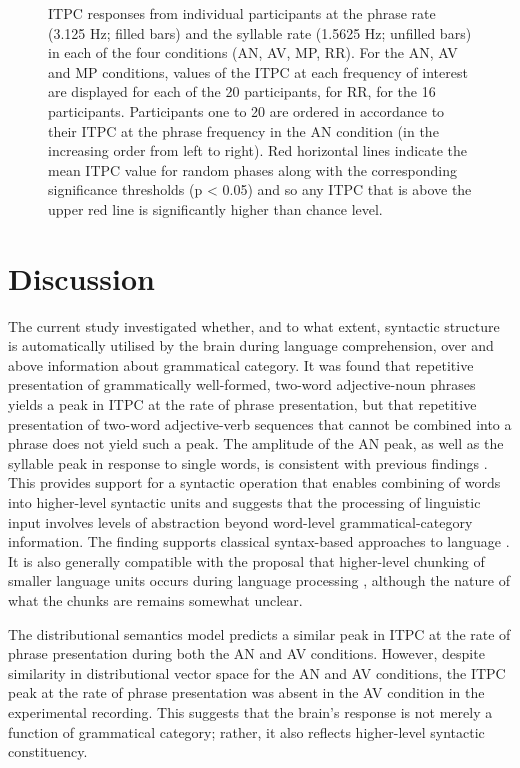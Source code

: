 \documentclass[10pt,letterpaper]{article}
\newcommand{\citet}[1]{\cite{#1}}
\begin{document}
\begin{figure}[tbhp]

\caption{ITPC responses from individual participants at the phrase
  rate (3.125 Hz; filled bars) and the syllable rate (1.5625 Hz;
  unfilled bars) in each of the four conditions (AN, AV, MP, RR). For
  the AN, AV and MP conditions, values of the ITPC at each frequency
  of interest are displayed for each of the 20 participants, for RR,
  for the 16 participants. Participants one to 20 are ordered in
  accordance to their ITPC at the phrase frequency in the AN condition
  (in the increasing order from left to right). Red horizontal lines
  indicate the mean ITPC value for random phases along with the
  corresponding significance thresholds (p < 0.05) and so any ITPC
  that is above the upper red line is significantly higher than chance
  level.}
\label{fig:Fig3}
\end{figure}


\section*{Discussion}


The current study investigated whether, and to what extent, syntactic
structure is automatically utilised by the brain during language
comprehension, over and above information about grammatical
category. It was found that repetitive presentation of grammatically
well-formed, two-word adjective-noun phrases yields a peak in ITPC at
the rate of phrase presentation, but that repetitive presentation of
two-word adjective-verb sequences that cannot be combined into a
phrase does not yield such a peak. The amplitude of the AN peak, as well
as the syllable peak in response to single words, is consistent with
previous findings \citet{DingEtAl2017}. This provides support for a
syntactic operation that enables combining of words into higher-level
syntactic units and suggests that the processing of linguistic input
involves levels of abstraction beyond word-level grammatical-category
information. The finding supports classical syntax-based approaches to
language \citet{BerwickEtAl2013,EveraertEtAl2015,Chomsky1995}. It is
also generally compatible with the proposal that higher-level chunking
of smaller language units occurs during language processing
\citet{ChristiansenChater2016}, although the nature of what the chunks
are remains somewhat unclear.

The distributional semantics model predicts a similar peak in ITPC at
the rate of phrase presentation during both the AN and AV
conditions. However, despite similarity in distributional vector space
for the AN and AV conditions, the ITPC peak at the rate of phrase
presentation was absent in the AV condition in the experimental
recording. This suggests that the brain's response is not merely a
function of grammatical category; rather, it also reflects
higher-level syntactic constituency.
\end{document}
